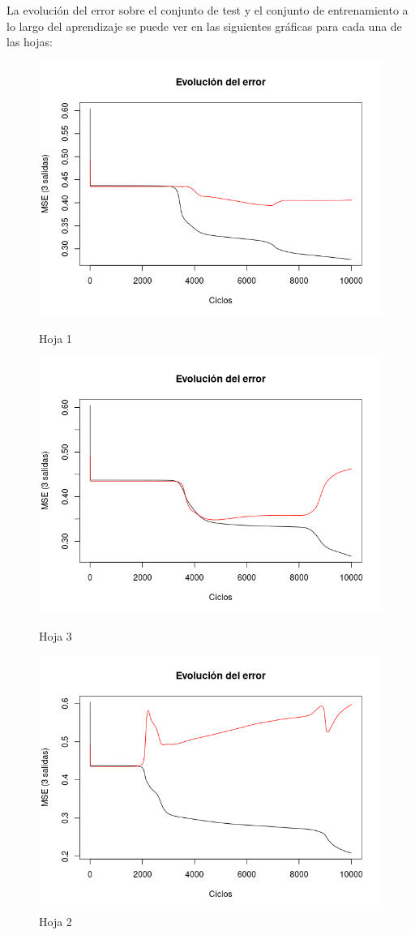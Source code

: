 \documentclass{uc3mpracticas}
\begin{document}
La evolución del error sobre el conjunto de test y el conjunto de entrenamiento a lo largo del aprendizaje se puede ver en las siguientes gráficas para cada una de las hojas:

\begin{figure}[!h]
\centering
\begin{minipage}{.52\textwidth}
  \centering
  \includegraphics[width=.8\linewidth]{Images/best_fold1.png}
  \caption*{Hoja 1}

  \includegraphics[width=.8\linewidth]{Images/best_fold3.png}
  \caption*{Hoja 3}
\end{minipage}%
\begin{minipage}{.52\textwidth}
  \centering
  \includegraphics[width=.8\linewidth]{Images/best_fold2.png}
  \caption*{Hoja 2}


\end{minipage}
\end{figure}
\end{document}
